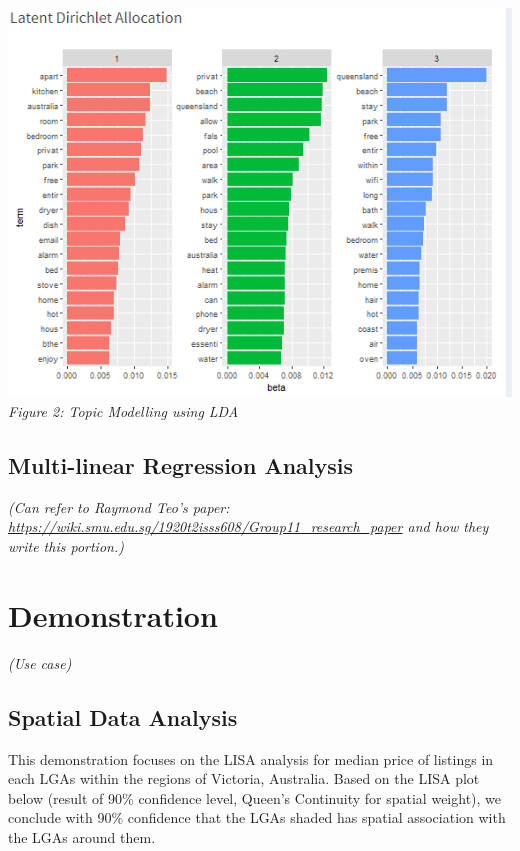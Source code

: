 \documentclass{acm_proc_article-sp}
\begin{document}
\includegraphics{images/topicmodel1.png} \emph{Figure 2: Topic Modelling
using LDA}

\hypertarget{multi-linear-regression-analysis}{%
\subsection{Multi-linear Regression
Analysis}\label{multi-linear-regression-analysis}}

\emph{(Can refer to Raymond Teo's paper:
\url{https://wiki.smu.edu.sg/1920t2isss608/Group11_research_paper} and
how they write this portion.)}

\hypertarget{demonstration}{%
\section{Demonstration}\label{demonstration}}

\emph{(Use case)}

\hypertarget{spatial-data-analysis-1}{%
\subsection{Spatial Data Analysis}\label{spatial-data-analysis-1}}

This demonstration focuses on the LISA analysis for median price of
listings in each LGAs within the regions of Victoria, Australia. Based
on the LISA plot below (result of 90\% confidence level, Queen's
Continuity for spatial weight), we conclude with 90\% confidence that
the LGAs shaded has spatial association with the LGAs around them.
\end{document}
